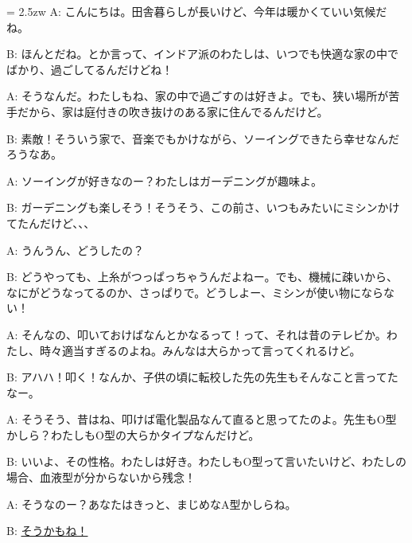 \documentclass[11pt]{amsart}
\title{}
\author{}
\newenvironment{hangall}[1]{\hangindent = 2.5zw\everypar{\hangindent = 2.5zw}}{}
\begin{document}
\maketitle
\begin{hangall}{}%
A: こんにちは。田舎暮らしが長いけど、今年は暖かくていい気候だね。

B: ほんとだね。とか言って、インドア派のわたしは、いつでも快適な家の中でばかり、過ごしてるんだけどね！

A: そうなんだ。わたしもね、家の中で過ごすのは好きよ。でも、狭い場所が苦手だから、家は庭付きの吹き抜けのある家に住んでるんだけど。

B: 素敵！そういう家で、音楽でもかけながら、ソーイングできたら幸せなんだろうなあ。

A: ソーイングが好きなのー？わたしはガーデニングが趣味よ。

B: ガーデニングも楽しそう！そうそう、この前さ、いつもみたいにミシンかけてたんだけど、、、

A: うんうん、どうしたの？

B: どうやっても、上糸がつっぱっちゃうんだよねー。でも、機械に疎いから、なにがどうなってるのか、さっぱりで。どうしよー、ミシンが使い物にならない！

A: そんなの、叩いておけばなんとかなるって！って、それは昔のテレビか。わたし、時々適当すぎるのよね。みんなは大らかって言ってくれるけど。

B: アハハ！叩く！なんか、子供の頃に転校した先の先生もそんなこと言ってたなー。

A: そうそう、昔はね、叩けば電化製品なんて直ると思ってたのよ。先生もO型かしら？わたしもO型の大らかタイプなんだけど。

B: いいよ、その性格。わたしは好き。わたしもO型って言いたいけど、わたしの場合、血液型が分からないから残念！

A: そうなのー？あなたはきっと、まじめなA型かしらね。

B: \ul{そうかもね！}\end{hangall}
\end{document}

